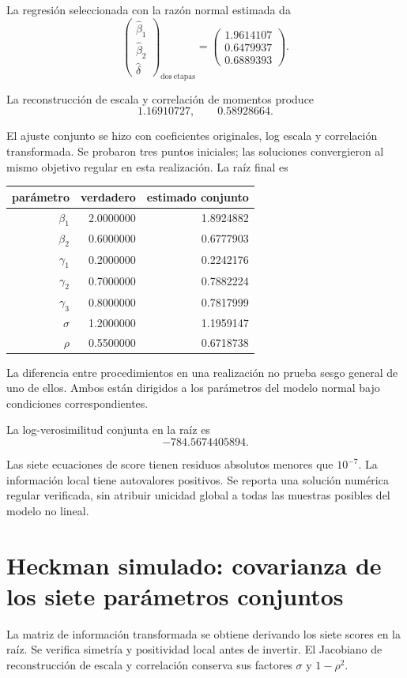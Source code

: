 \documentclass[11pt,a4paper]{article}
\begin{document}
La regresión seleccionada con
la razón normal estimada da
\[
\begin{pmatrix}\widehat\beta_1\\\widehat\beta_2\\\widehat\delta\end{pmatrix}_{\mathrm{dos\ etapas}}=\begin{pmatrix}1.9614107\\0.6479937\\0.6889393\end{pmatrix}.
\]

La reconstrucción de escala
y correlación de momentos produce
\[
1.16910727,\qquad 0.58928664.
\]

El ajuste conjunto se hizo
con coeficientes originales,
log escala y correlación transformada.
Se probaron tres puntos iniciales;
las soluciones convergieron al
mismo objetivo regular en
esta realización.
La raíz final es
\begin{center}\small\begin{tabular}{rrr}\toprule
parámetro&verdadero&estimado conjunto\\\midrule
\(\beta_1\)&2.0000000&1.8924882\\
\(\beta_2\)&0.6000000&0.6777903\\
\(\gamma_1\)&0.2000000&0.2242176\\
\(\gamma_2\)&0.7000000&0.7882224\\
\(\gamma_3\)&0.8000000&0.7817999\\
\(\sigma\)&1.2000000&1.1959147\\
\(\rho\)&0.5500000&0.6718738\\\bottomrule\end{tabular}\end{center}
La diferencia entre procedimientos
en una realización no prueba
sesgo general de uno de ellos.
Ambos están dirigidos a los
parámetros del modelo normal
bajo condiciones correspondientes.

La log-verosimilitud conjunta
en la raíz es
\[
-784.5674405894.
\]

Las siete ecuaciones de score
tienen residuos absolutos menores
que \(10^{-7}\).
La información local tiene
autovalores positivos.
Se reporta una solución
numérica regular verificada,
sin atribuir unicidad global
a todas las muestras posibles
del modelo no lineal.

\clearpage
\section{Heckman simulado: covarianza de los siete parámetros conjuntos}\label{unidad167}
La matriz de información transformada
se obtiene derivando los siete
scores en la raíz.
Se verifica simetría y
positividad local antes de invertir.
El Jacobiano de reconstrucción
de escala y correlación conserva
sus factores \(\sigma\) y \(1-\rho^2\).
\end{document}
